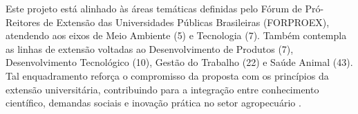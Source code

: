 Este projeto está alinhado às áreas temáticas definidas pelo Fórum de Pró-Reitores de Extensão das Universidades Públicas Brasileiras (FORPROEX), atendendo aos eixos de Meio Ambiente (5) e Tecnologia (7). Também contempla as linhas de extensão voltadas ao Desenvolvimento de Produtos (7), Desenvolvimento Tecnológico (10), Gestão do Trabalho (22) e Saúde Animal (43). Tal enquadramento reforça o compromisso da proposta com os princípios da extensão universitária, contribuindo para a integração entre conhecimento científico, demandas sociais e inovação prática no setor agropecuário \cite{FORPROEX}.